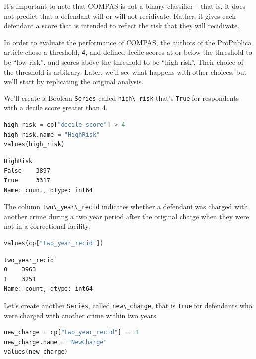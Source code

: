 It's important to note that COMPAS is not a binary classifier -- that
is, it does not predict that a defendant will or will not recidivate.
Rather, it gives each defendant a score that is intended to reflect the
risk that they will recidivate.

In order to evaluate the performance of COMPAS, the authors of the
ProPublica article chose a threshold, \passthrough{\lstinline!4!}, and
defined decile scores at or below the threshold to be ``low risk'', and
scores above the threshold to be ``high risk''. Their choice of the
threshold is arbitrary. Later, we'll see what happens with other
choices, but we'll start by replicating the original analysis.

We'll create a Boolean \passthrough{\lstinline!Series!} called
\passthrough{\lstinline!high\_risk!} that's
\passthrough{\lstinline!True!} for respondents with a decile score
greater than 4.

\begin{lstlisting}[language=Python,style=source]
high_risk = cp["decile_score"] > 4
high_risk.name = "HighRisk"
values(high_risk)
\end{lstlisting}

\begin{lstlisting}[style=output]
HighRisk
False    3897
True     3317
Name: count, dtype: int64
\end{lstlisting}

The column \passthrough{\lstinline!two\_year\_recid!} indicates whether
a defendant was charged with another crime during a two year period
after the original charge when they were not in a correctional facility.

\begin{lstlisting}[language=Python,style=source]
values(cp["two_year_recid"])
\end{lstlisting}

\begin{lstlisting}[style=output]
two_year_recid
0    3963
1    3251
Name: count, dtype: int64
\end{lstlisting}

Let's create another \passthrough{\lstinline!Series!}, called
\passthrough{\lstinline!new\_charge!}, that is
\passthrough{\lstinline!True!} for defendants who were charged with
another crime within two years.

\begin{lstlisting}[language=Python,style=source]
new_charge = cp["two_year_recid"] == 1
new_charge.name = "NewCharge"
values(new_charge)
\end{lstlisting}

